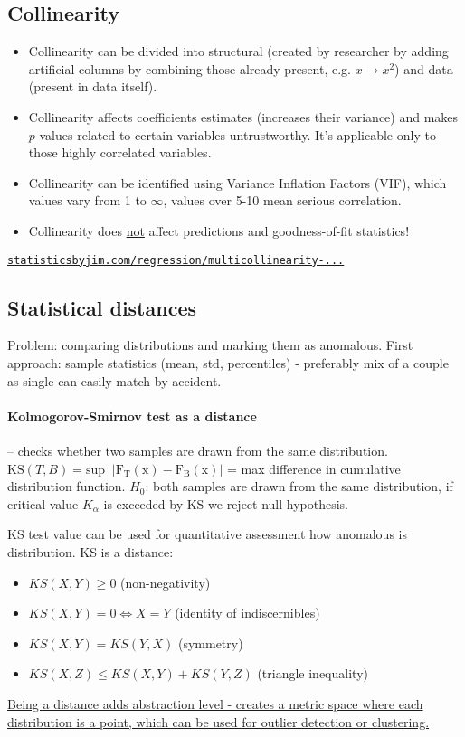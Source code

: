 \documentclass{article}
\begin{document}
\subsection{Collinearity}
\begin{itemize}
\item Collinearity can be divided into structural (created by researcher by adding artificial columns by combining those already present, e.g. $x \rightarrow x^2$) and data (present in data itself).
\item Collinearity affects coefficients estimates (increases their variance) and makes $p$ values related to certain variables untrustworthy. It's applicable only to those highly correlated variables.
\item Collinearity can be identified using Variance Inflation Factors (VIF), which values vary from 1 to $\infty$, values over 5-10 mean serious correlation.
\item Collinearity does \underline{not} affect predictions and goodness-of-fit statistics! 
\end{itemize}

\href{http://statisticsbyjim.com/regression/multicollinearity-in-regression-analysis/}{\texttt{statisticsbyjim.com/regression/multicollinearity-...}}



\subsection{Statistical distances}
Problem: comparing distributions and marking them as anomalous. 
First approach: sample statistics (mean, std, percentiles) - preferably mix of a couple as single can easily match by accident.

\paragraph*{Kolmogorov-Smirnov test as a distance}
 -- checks whether two samples are drawn from the same distribution. $\mathrm{KS}(T, B) = \mathrm{sup\;\;|F_T(x) - F_B(x)|}$ = max difference in cumulative distribution function.
$H_0$: both samples are drawn from the same distribution, if critical value $K_{\alpha}$ is exceeded by KS we reject null hypothesis.

KS test value can be used for quantitative assessment how anomalous is distribution. KS is a distance:
\begin{itemize}[topsep=5pt, itemsep=-2pt, label={--}]
\item $KS(X,Y) \geq 0$ (non-negativity)
\item $KS(X,Y) = 0 \iff X = Y$ (identity of indiscernibles)
\item $KS(X,Y) = KS(Y,X)$ (symmetry)
\item $KS(X,Z) \leq KS(X,Y) + KS(Y,Z)$ (triangle inequality)
\end{itemize}
\ul{Being a distance adds abstraction level - creates a metric space where each distribution is a point, which can be used for outlier detection or clustering.}
\end{document}
